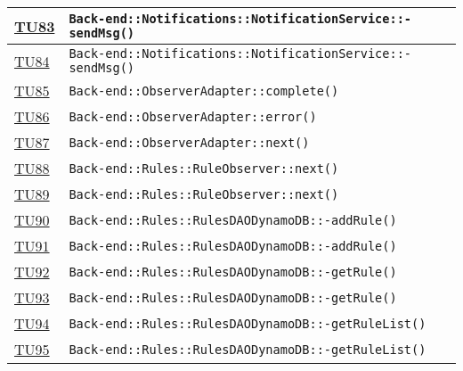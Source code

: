 \begin{longtable}{|>{\centering}m{1cm}|m{12cm}<{\centering}|}
\hyperlink{TU83}{TU83} & \texttt{Back-end::Notifications::NotificationService::-\linebreak sendMsg()}\\ \hline

\hyperlink{TU84}{TU84} & \texttt{Back-end::Notifications::NotificationService::-\linebreak sendMsg()}\\ \hline

\hyperlink{TU85}{TU85} & \texttt{Back-end::ObserverAdapter::complete()}\\ \hline

\hyperlink{TU86}{TU86} & \texttt{Back-end::ObserverAdapter::error()}\\ \hline

\hyperlink{TU87}{TU87} & \texttt{Back-end::ObserverAdapter::next()}\\ \hline

\hyperlink{TU88}{TU88} & \texttt{Back-end::Rules::RuleObserver::next()}\\ \hline

\hyperlink{TU89}{TU89} & \texttt{Back-end::Rules::RuleObserver::next()}\\ \hline

\hyperlink{TU90}{TU90} & \texttt{Back-end::Rules::RulesDAODynamoDB::-\linebreak addRule()}\\ \hline

\hyperlink{TU91}{TU91} & \texttt{Back-end::Rules::RulesDAODynamoDB::-\linebreak addRule()}\\ \hline

\hyperlink{TU92}{TU92} & \texttt{Back-end::Rules::RulesDAODynamoDB::-\linebreak getRule()}\\ \hline

\hyperlink{TU93}{TU93} & \texttt{Back-end::Rules::RulesDAODynamoDB::-\linebreak getRule()}\\ \hline

\hyperlink{TU94}{TU94} & \texttt{Back-end::Rules::RulesDAODynamoDB::-\linebreak getRuleList()}\\ \hline

\hyperlink{TU95}{TU95} & \texttt{Back-end::Rules::RulesDAODynamoDB::-\linebreak getRuleList()}\\ \hline


\end{longtable}
